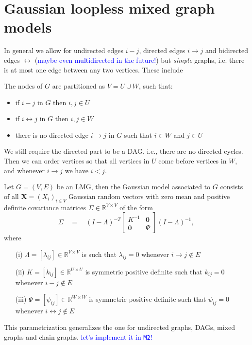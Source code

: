 \documentclass[10pt,a4paper]{article}
\newcommand{\RR}{\mathbb{R}}
\newcommand{\bs}{\boldsymbol}
\begin{document}
\newpage 
\section{Gaussian loopless mixed graph models}

In general we allow for undirected edges $i-j$, directed edges $i\to j$ and bidirected edges $\leftrightarrow$ (\textcolor{blue}{maybe even multidirected in the future!}) but \textit{simple} graphs, i.e. there is at most one edge between any two vertices. These include 

The nodes of $G$ are partitioned as $V = U\cup W$, such that:
\begin{itemize}
\item if $i-j$ in $G$ then $i,j\in U$
\item if $i\leftrightarrow j$ in $G$ then $i,j\in W$ 
\item there is no directed edge $i\to j$ in $G$ such that $i\in W$ and $j\in U$
\end{itemize}

 We still require the directed part to be a DAG, i.e., there are no directed cycles.  Then we can order vertices so that all vertices in $U$ come before vertices in $W$, and whenever $i\to j$ we have $i<j$. 

Let $G=(V,E)$ be an LMG, then the Gaussian model associated to $G$ consists of all $\bs X=(X_i)_{i\in V}$ Gaussian random vectors with zero mean and positive definite covariance matrices $\Sigma \in \RR^{V \times V}$ of the form
 \begin{equation}\label{eq:parametrization}
\Sigma\quad=\quad (I-\Lambda)^{-T}\left[\begin{array}{cc}
K^{-1} & \bs 0\\
\bs 0 & \Psi
\end{array}
\right](I-\Lambda)^{-1},
\end{equation}
where 
\begin{itemize}
\item[(i)] $\Lambda=[\lambda_{ij}]\in \RR^{V\times V}$ is such that $\lambda_{ij}=0$ whenever $i\to j \notin E$
\item[(ii)] $K=[k_{ij}] \in \RR^{U\times U}$ is symmetric positive definite such that $k_{ij}=0$ whenever $i-j\notin E$
\item[(iii)] $\Psi =[\psi_{ij}]\in \RR^{W\times W}$ is symmetric positive definite such that  $\psi_{ij}=0$ whenever $i\leftrightarrow j\notin E$
\end{itemize}

This parametrization generalizes the one for undirected graphs, DAGs, mixed graphs and chain graphs. \textcolor{blue}{let's implement it in \texttt{M2}!}



\end{document}
